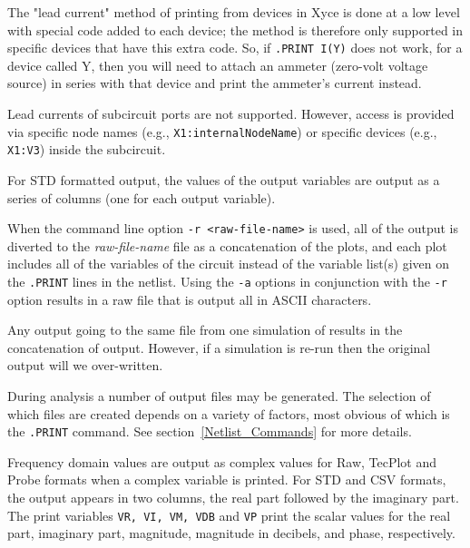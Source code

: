 \begin{Command}
\begin{XyceItemize}
\item The "lead current" method of printing from devices in Xyce is done
  at a low level with special code added to each device; the method is
  therefore only supported in specific devices that have this extra
  code.  So, if \texttt{.PRINT I(Y)} does not work, for a device called
  Y, then you will need to attach an ammeter (zero-volt voltage source)
  in series with that device and print the ammeter's current instead.

\item Lead currents of subcircuit ports are not supported.  However,
  access is provided via specific node names (e.g.,
  \texttt{X1:internalNodeName}) or specific devices (e.g.,
  \texttt{X1:V3}) inside the subcircuit.

\item For STD formatted output, the values of the output variables are
  output as a series of columns (one for each output variable).

\item When the command line option \texttt{-r <raw-file-name>} is used,
  all of the output is diverted to the \emph{raw-file-name} file as a
  concatenation of the plots, and each plot includes all of the
  variables of the circuit instead of the variable list(s) given on the
  \texttt{.PRINT} lines in the netlist.  Using the \texttt{-a} options in
  conjunction with the \texttt{-r} option results in a raw file that is
  output all in ASCII characters.

\item Any output going to the same file from one simulation of \Xyce{}
  results in the concatenation of output.  However, if a simulation is
  re-run then the original output will we over-written.

\item During analysis a number of output files may be generated.  The
  selection of which files are created depends on a variety of factors,
  most obvious of which is the \texttt{.PRINT} command. See
  section~\ref{Netlist_Commands} for more details.

\item Frequency domain values are output as complex values for Raw,
  TecPlot and Probe formats when a complex variable is printed.  For STD
  and CSV formats, the output appears in two columns, the real part
  followed by the imaginary part.  The print variables 
  \texttt{VR, VI, VM, VDB} and \texttt{VP} print the scalar values 
  for the real part, imaginary part,
  magnitude, magnitude in decibels, and phase, respectively.


\end{XyceItemize}
\end{Command}
